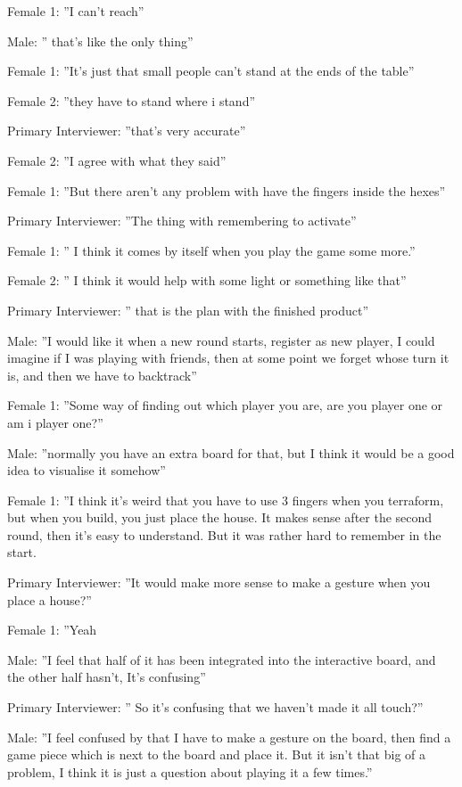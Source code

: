 Female 1: ”I can’t reach”

Male: ” that’s like the only thing”

Female 1: ”It’s just that small people can’t stand at the ends of the table”

Female 2: ”they have to stand where i stand”

Primary Interviewer: ”that’s very accurate”

Female 2: ”I agree with what they said”

Female 1: ”But there aren’t any problem with have the fingers inside the hexes”

Primary Interviewer: ”The thing with remembering to activate”

Female 1: ” I think it comes by itself when you play the game some more.”

Female 2: ” I think it would help with some light or something like that”

Primary Interviewer: ” that is the plan with the finished product”

Male: ”I would like it when a new round starts, register as new player, I could imagine if I was playing with friends, then at some point we forget whose turn it is, and then we have to backtrack”

Female 1: ”Some way of finding out which player you are, are you player one or am i player one?”

Male: ”normally you have an extra board for that, but I think it would be a good idea to visualise it somehow”

Female 1: ”I think it’s weird that you have to use 3 fingers when you terraform, but when you build, you just place the house. It makes sense after the second round, then it’s easy to understand. But it was rather hard to remember in the start.

Primary Interviewer: ”It would make more sense to make a gesture when you place a house?”

Female 1: ”Yeah 

Male: ”I feel that half of it has been integrated into the interactive board, and the other half hasn’t, It’s confusing”

Primary Interviewer: ” So it’s confusing that we haven’t made it all touch?”

Male: ”I feel confused by that I have to make a gesture on the board, then find a game piece which is next to the board and place it. But it isn’t that big of a problem, I think it is just a question about playing it a few times.”

